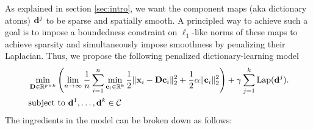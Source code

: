 As explained in section \ref{sec:intro}, we want the component maps (aka dictionary atoms) $\mathbf{d}^j$ to be sparse and spatially smooth. A principled way to achieve such a goal is to impose a boundedness constraint on $\ell_1$-like norms of these maps to achieve sparsity and
simultaneously impose smoothness by penalizing their Laplacian.
Thus, we propose the following penalized dictionary-learning model
\begin{eqnarray}
\begin{split}
  &\min_{\mathbf{D} \in \mathbb R^{p \times k}}\left(\lim_{n \rightarrow \infty}\frac{1}{n}\sum_{i=1}^n\min_{\mathbf{c}_i \in \mathbb R^{k}}\frac{1}{2} \|\mathbf{x}_i-\mathbf{D}\mathbf{c}_i\|_2^2 +  \frac{1}{2}\alpha\|\mathbf{c}_i\|_2^2\right) + \gamma\sum_{j=1}^k{\text{Lap}}(\mathbf{d}^j).\\
  &\text{subject to }\mathbf{d}^1,\ldots,\mathbf{d}^k \in \mathcal C
\end{split}
\label{eq:ss}
\end{eqnarray}
The ingredients in the model can be broken down as follows:
